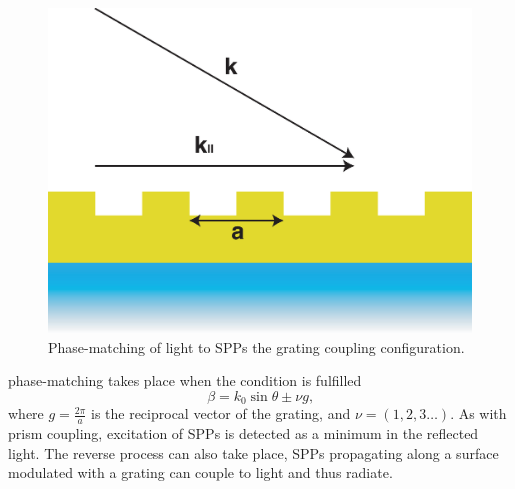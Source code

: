 \begin{figure}[htb]
\centering
\includegraphics[scale=0.5]{figures/grating.eps}
\caption{\label{fig:grating}Phase-matching of light to SPPs the grating coupling configuration.}
\end{figure}
phase-matching takes place when the condition is fulfilled
\begin{equation}
\beta = k_0 \sin{\theta} \pm \nu g\text{,}
\end{equation}
where $g=\frac{2\pi}{a}$ is the reciprocal vector of the grating, and $\nu=(1,2,3\dots)$.
As with prism coupling, excitation of SPPs is detected as a minimum in the reflected light. The reverse process can also take place, SPPs propagating along a surface modulated with a grating can couple to light and thus radiate. 

%
%
